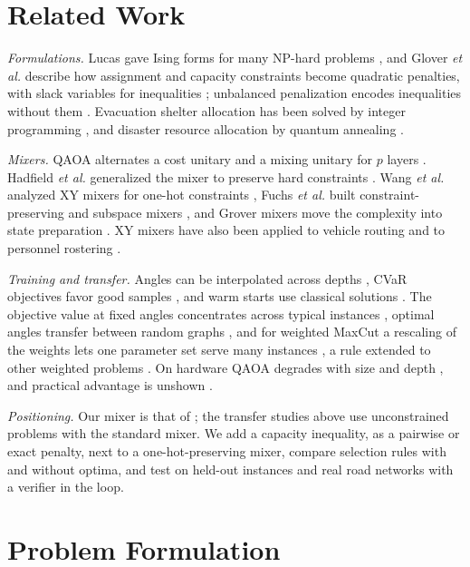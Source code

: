 \documentclass[conference]{IEEEtran}
\begin{document}
\section{Related Work}
\textit{Formulations.} Lucas gave Ising forms for many NP-hard problems \cite{Lucas2014}, and Glover \textit{et al.} describe how assignment and capacity constraints become quadratic penalties, with slack variables for inequalities \cite{Glover2019}; unbalanced penalization encodes inequalities without them \cite{Montanez2024}. Evacuation shelter allocation has been solved by integer programming \cite{Sherali1991}, and disaster resource allocation by quantum annealing \cite{Cadelina2024}.

\textit{Mixers.} QAOA alternates a cost unitary and a mixing unitary for $p$ layers \cite{Farhi2014,Blekos2024}. Hadfield \textit{et al.} generalized the mixer to preserve hard constraints \cite{Hadfield2019}. Wang \textit{et al.} analyzed XY mixers for one-hot constraints \cite{WangZ2020}, Fuchs \textit{et al.} built constraint-preserving \cite{Fuchs2022} and subspace mixers \cite{Fuchs2024}, and Grover mixers move the complexity into state preparation \cite{Bartschi2020}. XY mixers have also been applied to vehicle routing \cite{doCarmo2025} and to personnel rostering \cite{Gupta2026}.

\textit{Training and transfer.} Angles can be interpolated across depths \cite{Zhou2020}, CVaR objectives favor good samples \cite{Barkoutsos2020}, and warm starts use classical solutions \cite{Egger2021}. The objective value at fixed angles concentrates across typical instances \cite{Brandao2018}, optimal angles transfer between random graphs \cite{Galda2021}, and for weighted MaxCut a rescaling of the weights lets one parameter set serve many instances \cite{Shaydulin2023}, a rule extended to other weighted problems \cite{Sureshbabu2024}. On hardware QAOA degrades with size and depth \cite{Harrigan2021}, and practical advantage is unshown \cite{Abbas2024}.

\textit{Positioning.} Our mixer is that of \cite{WangZ2020}; the transfer studies above use unconstrained problems with the standard mixer. We add a capacity inequality, as a pairwise or exact penalty, next to a one-hot-preserving mixer, compare selection rules with and without optima, and test on held-out instances and real road networks with a verifier in the loop.

\section{Problem Formulation}
\end{document}
